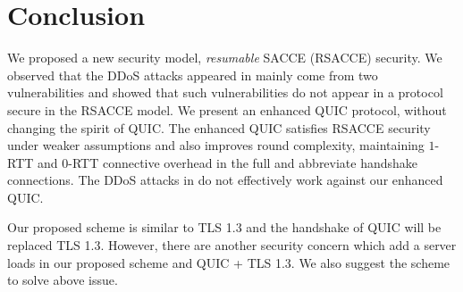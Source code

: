 \section{Conclusion} \label{sec:conclusion}

We proposed a new security model, \textit{resumable} SACCE (RSACCE) security.
We observed that the DDoS attacks appeared in \cite{LJBN15:QUIC} mainly come from
two vulnerabilities and showed that such vulnerabilities do not appear in a protocol secure in
the RSACCE model.
We present an enhanced QUIC protocol, without changing the spirit of QUIC.
The enhanced QUIC satisfies RSACCE security under weaker assumptions and also improves round complexity,
maintaining $1$-RTT and $0$-RTT connective overhead in the full and abbreviate handshake connections.
The DDoS attacks in \cite{LJBN15:QUIC} do not effectively work against our enhanced QUIC.

Our proposed scheme is similar to TLS 1.3 and the handshake of QUIC will be replaced
TLS 1.3. However, there are another security concern which add a server loads in our
proposed scheme and QUIC + TLS 1.3.
We also suggest the scheme to solve above issue.
\fi